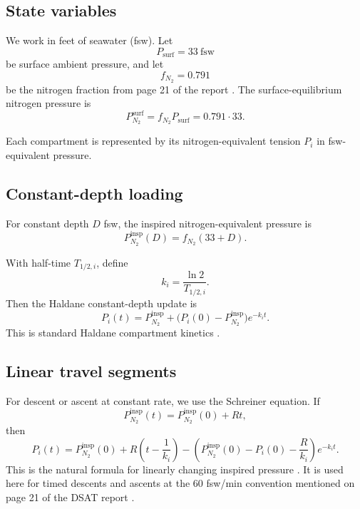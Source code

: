 \documentclass[11pt]{article}
\begin{document}
\subsection{State variables}

We work in feet of seawater (fsw). Let
\[
P_\mathrm{surf} = 33\ \text{fsw}
\]
be surface ambient pressure, and let
\[
f_{N_2} = 0.791
\]
be the nitrogen fraction from page 21 of the report \cite[p.~21]{Hamilton1994}. The surface-equilibrium nitrogen pressure is
\begin{equation}
P_{N_2}^{\mathrm{surf}} = f_{N_2} P_\mathrm{surf} = 0.791 \cdot 33.
\label{eq:surfaceeq}
\end{equation}

Each compartment is represented by its nitrogen-equivalent tension $P_i$ in fsw-equivalent pressure.

\subsection{Constant-depth loading}

For constant depth $D$ fsw, the inspired nitrogen-equivalent pressure is
\begin{equation}
P_{N_2}^{\mathrm{insp}}(D) = f_{N_2}(33 + D).
\label{eq:pinsp}
\end{equation}

With half-time $T_{1/2,i}$, define
\begin{equation}
k_i = \frac{\ln 2}{T_{1/2,i}}.
\label{eq:ki}
\end{equation}
Then the Haldane constant-depth update is
\begin{equation}
P_i(t) = P_{N_2}^{\mathrm{insp}} + \bigl(P_i(0)-P_{N_2}^{\mathrm{insp}}\bigr)e^{-k_i t}.
\label{eq:haldane}
\end{equation}
This is standard Haldane compartment kinetics \cite{NoStopMemo,ChapmanZH}.

\subsection{Linear travel segments}

For descent or ascent at constant rate, we use the Schreiner equation. If
\[
P_{N_2}^{\mathrm{insp}}(t)=P_{N_2}^{\mathrm{insp}}(0)+Rt,
\]
then
\begin{equation}
P_i(t)=P_{N_2}^{\mathrm{insp}}(0)+R\left(t-\frac{1}{k_i}\right)
-\left(P_{N_2}^{\mathrm{insp}}(0)-P_i(0)-\frac{R}{k_i}\right)e^{-k_i t}.
\label{eq:schreiner}
\end{equation}
This is the natural formula for linearly changing inspired pressure \cite{ChapmanZH}. It is used here for timed descents and ascents at the $60$ fsw/min convention mentioned on page 21 of the DSAT report \cite[p.~21]{Hamilton1994}.
\end{document}
